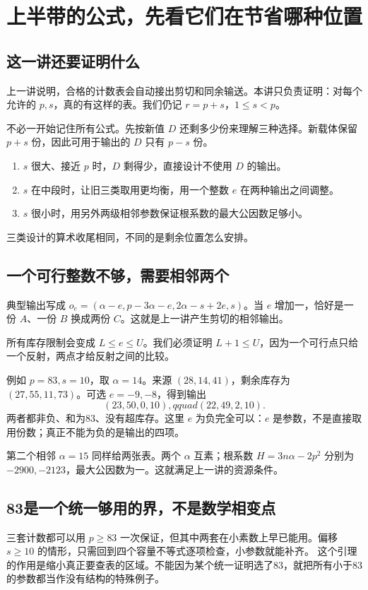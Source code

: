 \chapter{上半带的公式，先看它们在节省哪种位置}\label{ch:upper}
\section{这一讲还要证明什么}
上一讲说明，合格的计数表会自动接出剪切和同余输送。本讲只负责证明：对每个允许的 $p,s$，真的有这样的表。我们仍记 $r=p+s$，$1\le s<p$。

不必一开始记住所有公式。先按新值 $D$ 还剩多少份来理解三种选择。新载体保留 $p+s$ 份，因此可用于输出的 $D$ 只有 $p-s$ 份。
\begin{enumerate}
\item $s$ 很大、接近 $p$ 时，$D$ 剩得少，直接设计不使用 $D$ 的输出。
\item $s$ 在中段时，让旧三类取用更均衡，用一个整数 $e$ 在两种输出之间调整。
\item $s$ 很小时，用另外两级相邻参数保证根系数的最大公因数足够小。
\end{enumerate}
三类设计的算术收尾相同，不同的是剩余位置怎么安排。

\section{一个可行整数不够，需要相邻两个}
典型输出写成 $o_e=(\alpha-e,p-3\alpha-e,2\alpha-s+2e,s)$。当 $e$ 增加一，恰好是一份 $A$、一份 $B$ 换成两份 $C$。这就是上一讲产生剪切的相邻输出。

所有库存限制会变成 $L\le e\le U$。我们必须证明 $L+1\le U$，因为一个可行点只给一个反射，两点才给反射之间的比较。

例如 $p=83,s=10$，取 $\alpha=14$。来源 $(28,14,41)$，剩余库存为 $(27,55,11,73)$。可选 $e=-9,-8$，得到输出
\[(23,50,0,10),qquad(22,49,2,10).
\]
两者都非负、和为83、没有超库存。这里 $e$ 为负完全可以：$e$ 是参数，不是直接取用份数；真正不能为负的是输出的四项。

第二个相邻 $\alpha=15$ 同样给两张表。两个 $\alpha$ 互素；根系数 $H=3n\alpha-2p^2$ 分别为 $-2900,-2123$，最大公因数为一。这就满足上一讲的资源条件。

\section{83是一个统一够用的界，不是数学相变点}
三套计数都可以用 $p\ge83$ 一次保证，但其中两套在小素数上早已能用。偏移 $s\ge10$ 的情形，只需回到四个容量不等式逐项检查，小参数就能补齐。
这个引理的作用是缩小真正要查表的区域。不能因为某个统一证明选了83，就把所有小于83的参数都当作没有结构的特殊例子。

